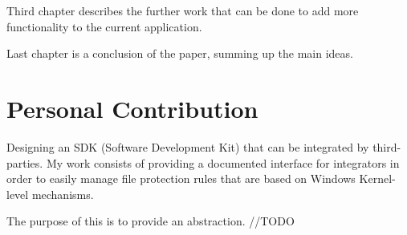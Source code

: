 	Third chapter describes the further work that can be done to add more functionality to the current application. 
	
	Last chapter is a conclusion of the paper, summing up the main ideas.
		
	\section{Personal Contribution}
	Designing an SDK (Software Development Kit) that can be integrated by third-parties. My work consists of providing a documented interface for integrators in order to easily manage file protection rules that are based on Windows Kernel-level mechanisms.
	
	The purpose of this is to provide an abstraction. //TODO
	
	
